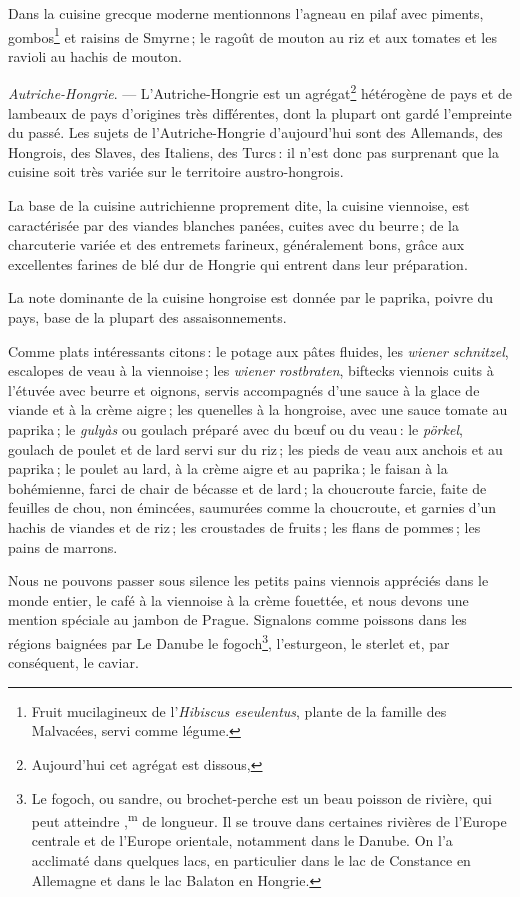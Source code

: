 Dans la cuisine grecque moderne mentionnons l'agneau en pilaf avec piments,
gombos\footnote{Fruit mucilagineux de l'\textit{Hibiscus eseulentus}, plante de
la famille des Malvacées, servi comme légume.} et raisins de Smyrne ; le ragoût
de mouton au riz et aux tomates et les ravioli au hachis de mouton.

\sk

\textit{Autriche-Hongrie}. — L'Autriche-Hongrie est un
agrégat\footnote{Aujourd'hui cet agrégat est dissous,} hétérogène de pays et de
lambeaux de pays d'origines très différentes, dont la plupart ont gardé
l'empreinte du passé. Les sujets de l'Autriche-Hongrie d'aujourd'hui sont des
Allemands, des Hongrois, des Slaves, des Italiens, des Turcs : il n'est donc
pas surprenant que la cuisine soit très variée sur le territoire
austro-hongrois.

La base de la cuisine autrichienne proprement dite, la cuisine viennoise, est
caractérisée par des viandes blanches panées, cuites avec du beurre ; de la
charcuterie variée et des entremets farineux, généralement bons, grâce aux
excellentes farines de blé dur de Hongrie qui entrent dans leur préparation.

La note dominante de la cuisine hongroise est donnée par le paprika, poivre
du pays, base de la plupart des assaisonnements.

Comme plats intéressants citons : le potage aux pâtes fluides, les
\textit{wiener schnitzel}, escalopes de veau à la viennoise ; les
\textit{wiener rostbraten}, biftecks viennois cuits à l'étuvée avec beurre et
oignons, servis accompagnés d'une sauce à la glace de viande et à la crème
aigre ; les quenelles à la hongroise, avec une sauce tomate au paprika ; le
\textit{gulyàs} ou goulach préparé avec du bœuf ou du veau : le
\textit{pörkel}, goulach de poulet et de lard servi sur du riz ; les pieds de
veau aux anchois et au paprika ; le poulet au lard, à la crème aigre et au
paprika ; le faisan à la bohémienne, farci de chair de bécasse et de lard ; la
choucroute farcie, faite de feuilles de chou, non émincées, saumurées comme la
choucroute, et garnies d'un hachis de viandes et de riz ; les croustades de
fruits ; les flans de pommes ; les pains de marrons.

Nous ne pouvons passer sous silence les petits pains viennois appréciés dans le
monde entier, le café à la viennoise à la crème fouettée, et nous devons une
mention spéciale au jambon de Prague. Signalons comme poissons dans les régions
baignées par Le Danube le fogoch\footnote{Le fogoch, ou sandre, ou
brochet-perche est un beau poisson de rivière, qui peut atteindre
{\mmm},{\mmm}\textsuperscript{m} de longueur. Il se trouve dans
certaines rivières de l'Europe centrale et de l'Europe orientale, notamment
dans le Danube. On l'a acclimaté dans quelques lacs, en particulier dans le lac
de Constance en Allemagne et dans le lac Balaton en Hongrie.}, l'esturgeon, le
sterlet et, par conséquent, le caviar.

